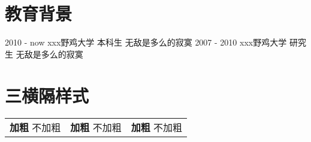 \documentclass[]{viccuad-cv}
\begin{document}





 
\section{教育背景}
    \begin{entrylistdated}
      \entrydated
        {2010 - now}
        {xxx野鸡大学}
        {本科生}
        {无敌是多么的寂寞}
      \entrydated
        {2007 - 2010}
        {xxx野鸡大学}
        {研究生}
        {无敌是多么的寂寞}
    \end{entrylistdated}



\section{三横隔样式}
    \begin{tabularx}{\linewidth}{XXr}
        \textbf{加粗} 不加粗& \textbf{加粗} 不加粗 & \textbf{加粗} 不加粗 \tabularnewline
    \end{tabularx}
 
\end{document}
